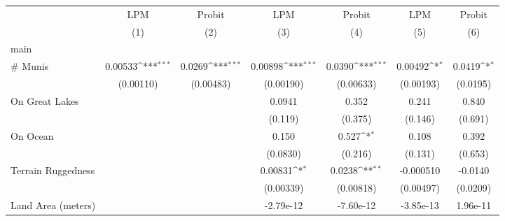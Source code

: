 {
\def\sym#1{\ifmmode^{#1}\else\(^{#1}\)\fi}
\begin{tabular}{l*{6}{c}}
\toprule
                    &\multicolumn{1}{c}{LPM}&\multicolumn{1}{c}{Probit}&\multicolumn{1}{c}{LPM}&\multicolumn{1}{c}{Probit}&\multicolumn{1}{c}{LPM}&\multicolumn{1}{c}{Probit}\\
                    &\multicolumn{1}{c}{(1)}         &\multicolumn{1}{c}{(2)}         &\multicolumn{1}{c}{(3)}         &\multicolumn{1}{c}{(4)}         &\multicolumn{1}{c}{(5)}         &\multicolumn{1}{c}{(6)}         \\
\midrule
main                &                     &                     &                     &                     &                     &                     \\
\# Munis            &     0.00533\sym{***}&      0.0269\sym{***}&     0.00898\sym{***}&      0.0390\sym{***}&     0.00492\sym{*}  &      0.0419\sym{*}  \\
                    &   (0.00110)         &   (0.00483)         &   (0.00190)         &   (0.00633)         &   (0.00193)         &    (0.0195)         \\
\addlinespace
On Great Lakes      &                     &                     &      0.0941         &       0.352         &       0.241         &       0.840         \\
                    &                     &                     &     (0.119)         &     (0.375)         &     (0.146)         &     (0.691)         \\
\addlinespace
On Ocean            &                     &                     &       0.150         &       0.527\sym{*}  &       0.108         &       0.392         \\
                    &                     &                     &    (0.0830)         &     (0.216)         &     (0.131)         &     (0.653)         \\
\addlinespace
Terrain Ruggedness  &                     &                     &     0.00831\sym{*}  &      0.0238\sym{**} &   -0.000510         &     -0.0140         \\
                    &                     &                     &   (0.00339)         &   (0.00818)         &   (0.00497)         &    (0.0209)         \\
\addlinespace
Land Area (meters)  &                     &                     &   -2.79e-12         &   -7.60e-12         &   -3.85e-13         &    1.96e-11         \\

\end{tabular}}
